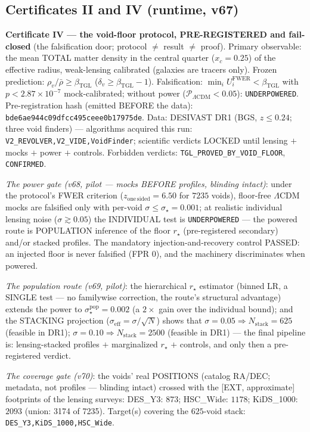 \documentclass[11pt]{article}
\newcommand{\bTGL}{\beta_{\mathrm{TGL}}}\newcommand{\Msun}{M_{\odot}}\newcommand{\TGL}{\mathrm{TGL}}
\theoremstyle{definition}\newtheorem{deriv}{Derivation}
\begin{document}
\subsection*{Certificates II and IV (runtime, v67)}

\textbf{Certificate IV --- the void-floor protocol, PRE-REGISTERED and fail-closed} (the falsification door; protocol $\neq$ result $\neq$ proof). Primary observable: the mean TOTAL matter density in the central quarter ($x_c=0.25$) of the effective radius, weak-lensing calibrated (galaxies are tracers only). Frozen prediction: $\rho_v/\bar\rho\ge\bTGL$ ($\delta_v\ge\bTGL-1$). Falsification: $\min_i U_i^{\mathrm{FWER}}<\bTGL$ with $p<2.87\times10^{-7}$ mock-calibrated; without power ($\mathcal P_{\Lambda\mathrm{CDM}}<0.05$): \texttt{UNDERPOWERED}. Pre-registration hash (emitted BEFORE the data): \texttt{bde6ae944c09dfcc495ceee0b17975de}. Data: DESIVAST DR1 (BGS, $z\le0.24$; three void finders) --- algorithms acquired this run: \texttt{V2\_REVOLVER,V2\_VIDE,VoidFinder}; scientific verdicts LOCKED until lensing $+$ mocks $+$ power $+$ controls. Forbidden verdicts: \texttt{TGL\_PROVED\_BY\_VOID\_FLOOR}, \texttt{CONFIRMED}.

\emph{The power gate (v68, pilot --- mocks BEFORE profiles, blinding intact)}: under the protocol's FWER criterion ($z_{\mathrm{one\,sided}}=6.50$ for $7235$ voids), floor-free $\Lambda$CDM mocks are falsified only with per-void $\sigma\le\sigma_\star=0.001$; at realistic individual lensing noise ($\sigma\gtrsim0.05$) the INDIVIDUAL test is \texttt{UNDERPOWERED} --- the powered route is POPULATION inference of the floor $r_\star$ (pre-registered secondary) and/or stacked profiles. The mandatory injection-and-recovery control PASSED: an injected floor is never falsified (FPR $0$), and the machinery discriminates when powered.

\emph{The population route (v69, pilot)}: the hierarchical $r_\star$ estimator (binned LR, a SINGLE test --- no familywise correction, the route's structural advantage) extends the power to $\sigma^{\mathrm{pop}}_\star=0.002$ (a $2\times$ gain over the individual bound); and the STACKING projection ($\sigma_{\mathrm{eff}}=\sigma/\sqrt{N}$) shows that $\sigma=0.05\Rightarrow N_{\mathrm{stack}}=625$ (feasible in DR1); $\sigma=0.10\Rightarrow N_{\mathrm{stack}}=2500$ (feasible in DR1) --- the final pipeline is: lensing-stacked profiles $+$ marginalized $r_\star$ $+$ controls, and only then a pre-registered verdict.

\emph{The coverage gate (v70)}: the voids' real POSITIONS (catalog RA/DEC; metadata, not profiles --- blinding intact) crossed with the [EXT, approximate] footprints of the lensing surveys: DES\_Y3: $873$; HSC\_Wide: $1178$; KiDS\_1000: $2093$ (union: 3174 of 7235). Target(s) covering the $625$-void stack: \texttt{DES\_Y3,KiDS\_1000,HSC\_Wide}.
\end{document}
